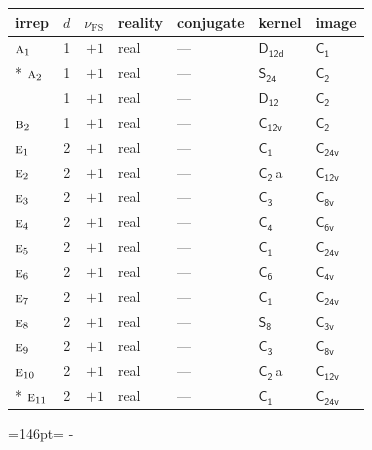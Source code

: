 \documentclass[10pt,a4paper]{article}
\newcommand{\needspace}[1]{\par\penalty-100\begingroup\dimen0=#1\relax\dimen2=\pagegoal
  \advance\dimen2-\pagetotal\ifdim\dimen0>\dimen2\relax\ifdim\dimen2>0pt\vfil\break\fi\fi
  \endgroup}
\numberwithin{equation}{section}
\newcommand{\grp}[1]{\mathsf{#1}}
\newcommand{\irr}[1]{\text{\normalfont\scshape #1}}
\newcommand{\detbox}[1]{{\setlength{\fboxsep}{1pt}\fbox{#1}}}
\newcommand{\clsletter}[1]{\,{\scriptsize\color{black!55}#1}}
\newcommand{\fsind}{\nu_{\mathrm{FS}}}
\begin{document}
{\small\renewcommand{\arraystretch}{1.25}\begin{longtable}{@{}lrrllll@{}}\toprule
irrep & $d$ & $\fsind$ & reality & conjugate & kernel & image\\\midrule\endhead
\bottomrule\endfoot\endlastfoot
$\irr{a}_{1}$ & 1 & $+1$ & real & --- & \href{D12d.pdf}{$\grp{D_{12d}}$} & \href{C1.pdf}{$\grp{C_{1}}$}\\*
$\irr{a}_{2}$ & 1 & $+1$ & real & --- & \href{S24.pdf}{$\grp{S_{24}}$} & \href{C2.pdf}{$\grp{C_{2}}$}\\
\detbox{$\irr{b}_{1}$} & 1 & $+1$ & real & --- & \href{D12.pdf}{$\grp{D_{12}}$} & \href{C2.pdf}{$\grp{C_{2}}$}\\
$\irr{b}_{2}$ & 1 & $+1$ & real & --- & \href{C12v.pdf}{$\grp{C_{12v}}$} & \href{C2.pdf}{$\grp{C_{2}}$}\\
$\irr{e}_{1}$ & 2 & $+1$ & real & --- & \href{C1.pdf}{$\grp{C_{1}}$} & $\grp{C_{24v}}$\\
$\irr{e}_{2}$ & 2 & $+1$ & real & --- & \href{C2.pdf}{$\grp{C_{2}}$}\clsletter{a} & \href{C12v.pdf}{$\grp{C_{12v}}$}\\
$\irr{e}_{3}$ & 2 & $+1$ & real & --- & \href{C3.pdf}{$\grp{C_{3}}$} & \href{C8v.pdf}{$\grp{C_{8v}}$}\\
$\irr{e}_{4}$ & 2 & $+1$ & real & --- & \href{C4.pdf}{$\grp{C_{4}}$} & \href{C6v.pdf}{$\grp{C_{6v}}$}\\
$\irr{e}_{5}$ & 2 & $+1$ & real & --- & \href{C1.pdf}{$\grp{C_{1}}$} & $\grp{C_{24v}}$\\
$\irr{e}_{6}$ & 2 & $+1$ & real & --- & \href{C6.pdf}{$\grp{C_{6}}$} & \href{C4v.pdf}{$\grp{C_{4v}}$}\\
$\irr{e}_{7}$ & 2 & $+1$ & real & --- & \href{C1.pdf}{$\grp{C_{1}}$} & $\grp{C_{24v}}$\\
$\irr{e}_{8}$ & 2 & $+1$ & real & --- & \href{S8.pdf}{$\grp{S_{8}}$} & \href{C3v.pdf}{$\grp{C_{3v}}$}\\
$\irr{e}_{9}$ & 2 & $+1$ & real & --- & \href{C3.pdf}{$\grp{C_{3}}$} & \href{C8v.pdf}{$\grp{C_{8v}}$}\\
$\irr{e}_{10}$ & 2 & $+1$ & real & --- & \href{C2.pdf}{$\grp{C_{2}}$}\clsletter{a} & \href{C12v.pdf}{$\grp{C_{12v}}$}\\*
$\irr{e}_{11}$ & 2 & $+1$ & real & --- & \href{C1.pdf}{$\grp{C_{1}}$} & $\grp{C_{24v}}$\\
\bottomrule\end{longtable}}
\needspace{146pt}
\end{document}
